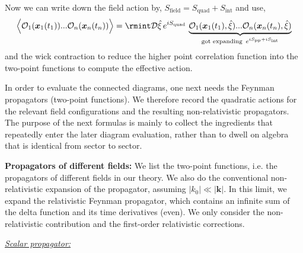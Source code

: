 Now we can write down the field action by, $S_{\text{field}}=S_{\text{quad}}+S_{\text{int}}$ and use,
\begin{align}
    \begin{split}
        \Big\langle\mathcal{O}_{1}(\boldsymbol{x}_1(t_1))...\mathcal{O}_{n}(\boldsymbol{x}_n(t_n))\Big\rangle=\rmint\mathcal{D}\hat\xi \,e^{iS_{\text{quad}}}\,\underbrace{\mathcal{O}_{1}(\boldsymbol{x}_1(t_1),\hat\xi)...\mathcal{O}_{n}(\boldsymbol{x}_n(t_n),\hat\xi)}_{\text{got expanding \,$e^{iS_{\text{pp}}+iS_{\text{int}}}$}}
    \end{split}
\end{align}
and the wick contraction to reduce the higher point correlation function into the two-point functions to compute the effective action.
\par
In order to evaluate the connected diagrams, one next needs the Feynman propagators (two-point functions). We therefore record the quadratic actions for the relevant field configurations and the resulting non-relativistic propagators. The purpose of the next formulas is mainly to collect the ingredients that repeatedly enter the later diagram evaluation, rather than to dwell on algebra that is identical from sector to sector.


\textbf{Propagators of different fields:} We list the two-point functions, i.e. the propagators of different fields in our theory. We also do the conventional non-relativistic expansion of the propagator, assuming $|k_0|\ll |\boldsymbol{k}|$. In this limit, we expand the relativistic Feynman propagator, which contains an infinite sum of the delta function and its time derivatives (even). We only consider the non-relativistic contribution and the first-order relativistic corrections.

\newpage
\underline{\textit{Scalar propagator:}}

